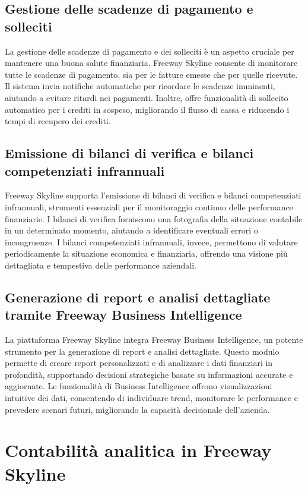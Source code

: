 \documentclass{article}
\begin{document}
\subsection{Gestione delle scadenze di pagamento e solleciti}

La gestione delle scadenze di pagamento e dei solleciti è un aspetto cruciale per mantenere una buona salute finanziaria. Freeway Skyline consente di monitorare tutte le scadenze di pagamento, sia per le fatture emesse che per quelle ricevute. Il sistema invia notifiche automatiche per ricordare le scadenze imminenti, aiutando a evitare ritardi nei pagamenti. Inoltre, offre funzionalità di sollecito automatico per i crediti in sospeso, migliorando il flusso di cassa e riducendo i tempi di recupero dei crediti.

\subsection{Emissione di bilanci di verifica e bilanci competenziati infrannuali}

Freeway Skyline supporta l'emissione di bilanci di verifica e bilanci competenziati infrannuali, strumenti essenziali per il monitoraggio continuo delle performance finanziarie. I bilanci di verifica forniscono una fotografia della situazione contabile in un determinato momento, aiutando a identificare eventuali errori o incongruenze. I bilanci competenziati infrannuali, invece, permettono di valutare periodicamente la situazione economica e finanziaria, offrendo una visione più dettagliata e tempestiva delle performance aziendali.

\subsection{Generazione di report e analisi dettagliate tramite Freeway Business Intelligence}

La piattaforma Freeway Skyline integra Freeway Business Intelligence, un potente strumento per la generazione di report e analisi dettagliate. Questo modulo permette di creare report personalizzati e di analizzare i dati finanziari in profondità, supportando decisioni strategiche basate su informazioni accurate e aggiornate. Le funzionalità di Business Intelligence offrono visualizzazioni intuitive dei dati, consentendo di individuare trend, monitorare le performance e prevedere scenari futuri, migliorando la capacità decisionale dell'azienda.


\section{Contabilità analitica in Freeway Skyline}
\end{document}
